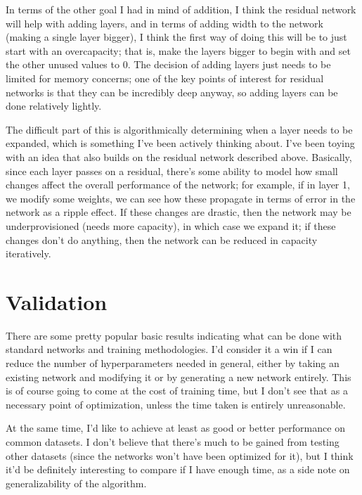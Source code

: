 \documentclass[11pt]{article}
\begin{document}
In terms of the other goal I had in mind of addition, I think the residual network will help with adding layers, and in terms of adding width to the network (making a single layer bigger), I think the first way of doing this will be to just start with an overcapacity; that is, make the layers bigger to begin with and set the other unused values to 0.
The decision of adding layers just needs to be limited for memory concerns; one of the key points of interest for residual networks is that they can be incredibly deep anyway, so adding layers can be done relatively lightly.

The difficult part of this is algorithmically determining when a layer needs to be expanded, which is something I've been actively thinking about.
I've been toying with an idea that also builds on the residual network described above.
Basically, since each layer passes on a residual, there's some ability to model how small changes affect the overall performance of the network; for example, if in layer 1, we modify some weights, we can see how these propagate in terms of error in the network as a ripple effect.
If these changes are drastic, then the network may be underprovisioned (needs more capacity), in which case we expand it; if these changes don't do anything, then the network can be reduced in capacity iteratively.

\section{Validation}
There are some pretty popular basic results indicating what can be done with standard networks and training methodologies.
I'd consider it a win if I can reduce the number of hyperparameters needed in general, either by taking an existing network and modifying it or by generating a new network entirely.
This is of course going to come at the cost of training time, but I don't see that as a necessary point of optimization, unless the time taken is entirely unreasonable.

At the same time, I'd like to achieve at least as good or better performance on common datasets.
I don't believe that there's much to be gained from testing other datasets (since the networks won't have been optimized for it), but I think it'd be definitely interesting to compare if I have enough time, as a side note on generalizability of the algorithm.
\end{document}
